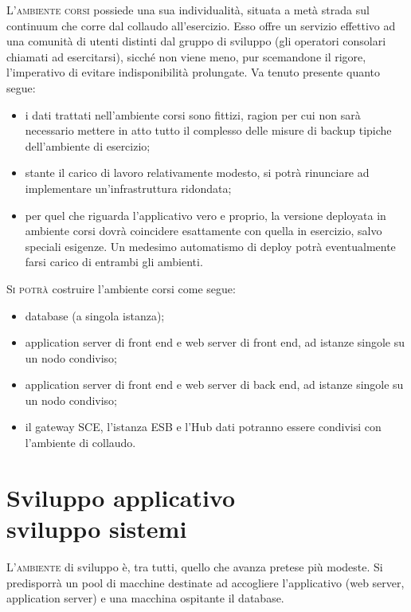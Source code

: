 \documentclass[headinclude,footinclude,a4paper,11pt,final]{scrreprt}
\begin{document}
\lettrine{L'}{ambiente corsi} possiede una sua individualità, situata a metà strada sul continuum che corre dal collaudo all'esercizio.  Esso offre un servizio effettivo ad una comunità di utenti distinti dal gruppo di sviluppo (gli operatori consolari chiamati ad esercitarsi), sicché non viene meno, pur scemandone il rigore, l'imperativo di evitare indisponibilità prolungate.  Va tenuto presente quanto segue:
\begin{itemize}
\item i dati trattati nell'ambiente corsi sono fittizi, ragion per cui non sarà necessario mettere in atto tutto il complesso delle misure di backup tipiche dell'ambiente di esercizio;
\item stante il carico di lavoro relativamente modesto, si potrà rinunciare ad implementare un'infrastruttura ridondata;
\item per quel che riguarda l'applicativo vero e proprio, la versione deployata in ambiente corsi dovrà coincidere esattamente con quella in esercizio, salvo speciali esigenze.  Un medesimo automatismo di deploy potrà eventualmente farsi carico di entrambi gli ambienti.
\end{itemize}

\bigskip

\lettrine{S}{i potrà} costruire l'ambiente corsi come segue:
\begin{itemize}
\item database (a singola istanza);
\item application server di front end e web server di front end, ad istanze singole su un nodo condiviso;
\item application server di front end e web server di back end, ad istanze singole su un nodo condiviso;
\item il gateway SCE, l'istanza ESB e l'Hub dati potranno essere condivisi con l'ambiente di collaudo.
\end{itemize}

\section{Sviluppo applicativo \\ sviluppo sistemi}

\lettrine{L'}{ambiente} di sviluppo è, tra tutti, quello che avanza pretese più modeste.  Si predisporrà un pool di macchine destinate ad accogliere l'applicativo (web server, application server) e una macchina ospitante il database.
\end{document}
